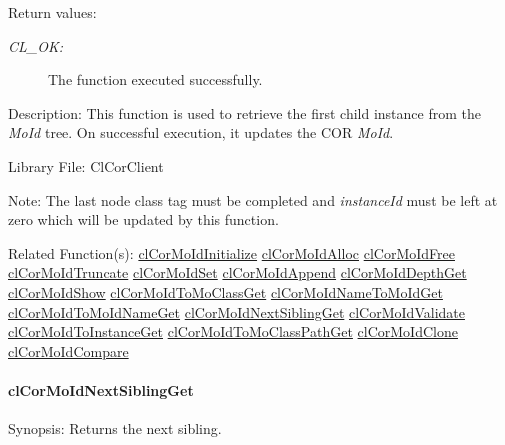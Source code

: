\begin{Desc}
\item[Return values:]
\begin{description}
\item[{\em CL\_\-OK:}]The function executed successfully.\end{description}
\end{Desc}
\begin{Desc}
\item[Description:]This function is used to retrieve the first child instance from the {\em Mo\-Id\/} tree. On successful execution, it updates the COR {\em Mo\-Id\/}.\end{Desc}
\begin{Desc}
\item[Library File:]Cl\-Cor\-Client\end{Desc}
\begin{Desc}
\item[Note:]The last node class tag must be completed and {\em instance\-Id\/} must be left at zero which will be updated by this function.\end{Desc}
\begin{Desc}
\item[Related Function(s):]\hyperlink{group__group13}{cl\-Cor\-Mo\-Id\-Initialize} \hyperlink{group__group13}{cl\-Cor\-Mo\-Id\-Alloc} \hyperlink{group__group13}{cl\-Cor\-Mo\-Id\-Free} \hyperlink{group__group13}{cl\-Cor\-Mo\-Id\-Truncate} \hyperlink{group__group13}{cl\-Cor\-Mo\-Id\-Set} \hyperlink{group__group13}{cl\-Cor\-Mo\-Id\-Append} \hyperlink{group__group13}{cl\-Cor\-Mo\-Id\-Depth\-Get} \hyperlink{group__group13}{cl\-Cor\-Mo\-Id\-Show} \hyperlink{group__group13}{cl\-Cor\-Mo\-Id\-To\-Mo\-Class\-Get} \hyperlink{group__group13}{cl\-Cor\-Mo\-Id\-Name\-To\-Mo\-Id\-Get} \hyperlink{group__group13}{cl\-Cor\-Mo\-Id\-To\-Mo\-Id\-Name\-Get} \hyperlink{group__group13}{cl\-Cor\-Mo\-Id\-Next\-Sibling\-Get} \hyperlink{group__group13}{cl\-Cor\-Mo\-Id\-Validate} \hyperlink{group__group13}{cl\-Cor\-Mo\-Id\-To\-Instance\-Get} \hyperlink{group__group13}{cl\-Cor\-Mo\-Id\-To\-Mo\-Class\-Path\-Get} \hyperlink{group__group13}{cl\-Cor\-Mo\-Id\-Clone} \hyperlink{group__group13}{cl\-Cor\-Mo\-Id\-Compare} \end{Desc}
\hypertarget{pagecor239}{}\paragraph{cl\-Cor\-Mo\-Id\-Next\-Sibling\-Get}\label{pagecor239}
\begin{Desc}
\item[Synopsis:]Returns the next sibling.\end{Desc}
